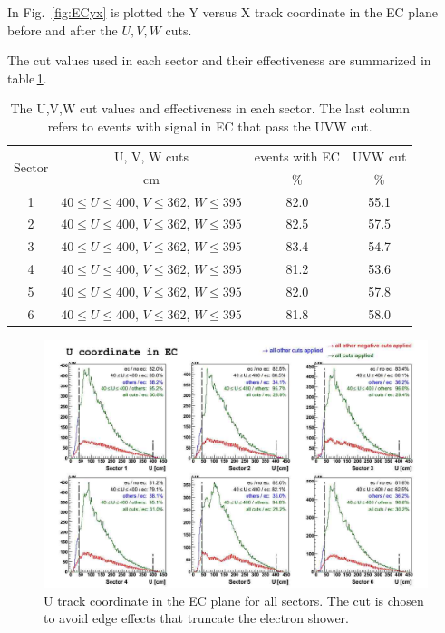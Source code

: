 In Fig.~\ref{fig:ECyx} is plotted the Y versus X track coordinate in the EC plane before and after
the $U,V,W$ cuts.

The cut values used in each sector and their effectiveness are summarized in 
table\,\ref{tab:uvwcut}.

\vspace{2cm}
\begin{table}[h]
\label{tab:uvwcut}
	\begin{center}
		\begin{tabular}{c | c | c | c}
			\hline 
			\multirow{2}{*}{Sector} 
					& U, V, W cuts & events with EC & UVW cut \\
					&  cm & \% & \% \\
			\hline
			1    & $40\leq U\leq400$, $V\leq362$, $W\leq395$ & 82.0 & 55.1 \\
			2    & $40\leq U\leq400$, $V\leq362$, $W\leq395$ & 82.5 & 57.5 \\
			3    & $40\leq U\leq400$, $V\leq362$, $W\leq395$ & 83.4 & 54.7 \\
			4    & $40\leq U\leq400$, $V\leq362$, $W\leq395$ & 81.2 & 53.6 \\
			5    & $40\leq U\leq400$, $V\leq362$, $W\leq395$ & 82.0 & 57.8 \\
			6    & $40\leq U\leq400$, $V\leq362$, $W\leq395$ & 81.8 & 58.0 \\
			\hline
		\end{tabular}
		\caption{The U,V,W cut values and effectiveness in each sector.
					The last column refers to events with signal in EC that pass the UVW cut.}	
	\end{center}
\end{table}

\clearpage
\begin{landscape}
\begin{figure}[ht]
  \centering
		\includegraphics[width=1.35\textheight]{img/ECu_no_cuts_on_sect1_each_sector.jpg}
		\caption{U track coordinate in the EC plane for all sectors. The cut is chosen to avoid
              edge effects that truncate the electron shower.}
 		\label{fig:ECu}
\end{figure}
\clearpage
\end{landscape}

